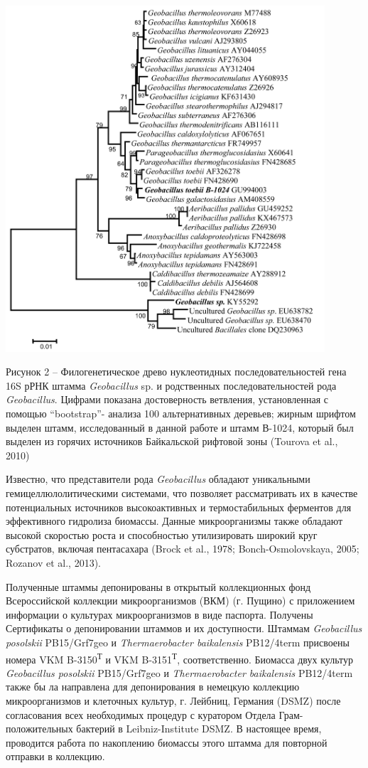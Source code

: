 \documentclass[a4paper,12pt,openany,final]{extreport}
\begin{document}
\includegraphics[width=4.68403in,height=5.06944in]{media/image13.png}

Рисунок 2 -- Филогенетическое древо нуклеотидных последовательностей
гена 16S рРНК штамма \emph{Geobacillus} sp. и родственных
последовательностей рода \emph{Geobacillus}. Цифрами показана
достоверность ветвления, установленная с помощью ``bootstrap''- анализа
100 альтернативных деревьев; жирным шрифтом выделен штамм, исследованный
в данной работе и штамм В-1024, который был выделен из горячих
источников Байкальской рифтовой зоны (Tourova et al., 2010)

Известно, что представители рода \emph{Geobacillus} обладают уникальными
гемицеллюлолитическими системами, что позволяет рассматривать их в
качестве потенциальных источников высокоактивных и термостабильных
ферментов для эффективного гидролиза биомассы. Данные микроорганизмы
также обладают высокой скоростью роста и способностью утилизировать
широкий круг субстратов, включая пентасахара (Brock et al., 1978;
Bonch-Osmolovskaya, 2005; Rozanov et al., 2013).

Полученные штаммы депонированы в открытый коллекционных фонд
Всероссийской коллекции микроорганизмов (ВКМ) (г. Пущино) с приложением
информации о культурах микроорганизмов в виде паспорта. Получены
Сертификаты о депонировании штаммов и их доступности. Штаммам
\emph{Geobacillus posolskii} PB15/Grf7geo и \emph{Thermaerobacter
baikalensis} PB12/4term присвоены номера VKM B-3150\textsuperscript{Т} и
VKM B-3151\textsuperscript{Т}, соответственно. Биомасса двух культур
\emph{Geobacillus posolskii} PB15/Grf7geo и \emph{Thermaerobacter
baikalensis} PB12/4term также бы ла направлена для депонирования в
немецкую коллекцию микроорганизмов и клеточных культур, г. Лейбниц,
Германия (DSMZ) после согласования всех необходимых процедур с куратором
Отдела Грам-положительных бактерий в Leibniz-Institute DSMZ. В настоящее
время, проводится работа по накоплению биомассы этого штамма для
повторной отправки в коллекцию.
\end{document}
